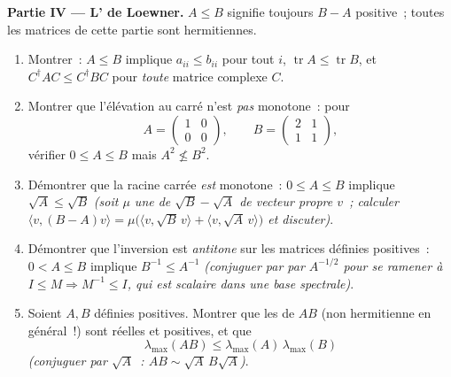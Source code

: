 \begin{problem}
\medskip
\noindent\textbf{Partie IV --- L' de Loewner.} $A \leq B$
signifie toujours $B - A$ positive~; toutes les matrices de cette
partie sont hermitiennes.
\begin{enumerate}[resume]
  \item Montrer~: $A \leq B$ implique $a_{ii} \leq b_{ii}$ pour tout
        $i$, $\operatorname{tr} A \leq \operatorname{tr} B$,
        et $C^\dagger AC \leq C^\dagger BC$ pour \emph{toute}
        matrice complexe $C$.
  \item Montrer que l'élévation au carré n'est \emph{pas} monotone~:
        pour
        \[
        A = \begin{pmatrix} 1 & 0\\ 0 & 0\end{pmatrix},
        \qquad
        B = \begin{pmatrix} 2 & 1\\ 1 & 1\end{pmatrix},
        \]
        vérifier $0 \leq A \leq B$ mais $A^2 \not\leq B^2$.
  \item Démontrer que la racine carrée \emph{est} monotone~: $0 \leq
        A \leq B$ implique $\sqrt A \leq \sqrt B$ \emph{(soit
        $\mu$ une  de $\sqrt B - \sqrt A$ de vecteur
        propre  $v$~; calculer $\langle v, (B - A)v\rangle =
        \mu\bigl(\langle v, \sqrt B\,v\rangle + \langle v,
        \sqrt A\,v\rangle\bigr)$ et discuter)}.
  \item Démontrer que l'inversion est \emph{antitone} sur les matrices
        définies positives~: $0 < A \leq B$ implique $B^{-1} \leq A^{-1}$
        \emph{(conjuguer par  par $A^{-1/2}$ pour se ramener
        à $I \leq M \Rightarrow M^{-1} \leq I$, qui est scalaire dans
        une base spectrale)}.
  \item Soient $A, B$ définies positives. Montrer que les
         de $AB$ (non hermitienne en général~!) sont
        réelles et positives, et que
        \[
        \lambda_{\max}(AB) \leq
        \lambda_{\max}(A)\,\lambda_{\max}(B)
        \]
        \emph{(conjuguer par $\sqrt A$~: $AB \sim \sqrt
        A\,B\sqrt A$)}.
\end{enumerate}


\end{problem}
